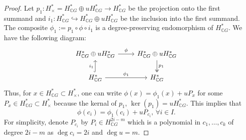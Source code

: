 \documentclass{amsart}
\begin{document}
\begin{proof}
		Let $p_1: H^*_{\times} = H^*_{\mathbb{C}G} \oplus u H^*_{\mathbb{C}G} \to H^*_{\mathbb{C}G}$ be the projection onto the first summand and $i_1: H^*_{\mathbb{C}G} \hookrightarrow H^*_{\mathbb{C}G} \oplus u H^*_{\mathbb{C}G}$ be the inclusion into the first summand. The composite $\phi_1:= p_1 \circ \phi \circ i_1$ is a degree-preserving endomorphism of $H^*_{\mathbb{C}G}$. We have the following %
diagram:
		\begin{equation}\label{comm diagram}
			\begin{tikzcd}
				{H^*_{\mathbb CG}\oplus u H^*_{\mathbb CG}} & {H^*_{\mathbb CG} \oplus u H^*_{\mathbb CG}} \\
				{H^*_{\mathbb CG}} & {H^*_{\mathbb CG}}
				\arrow["\phi", from=1-1, to=1-2]
				\arrow["{p_1}", two heads, from=1-2, to=2-2]
				\arrow["{i_1}", hook, from=2-1, to=1-1]
				\arrow["{\phi_1}", from=2-1, to=2-2]
			\end{tikzcd}
		\end{equation}
		Thus, %
for  $x \in H^*_{\mathbb{C}G} \subset H^*_\times$, one can write
		$\phi(x) = \phi_1(x) + u P_x$
		for some $P_x \in H^*_{\mathbb{C}G} \subset H^*_\times$ because the kernal of $p_1$, $\ker(p_1) = u H^*_{\mathbb{C}G}$.
		This implies that \begin{equation}\label{defn of phi}
			\phi(c_i) = \phi_1(c_i) + u P_{c_i},\, \forall i \in I.
		\end{equation} For simplicity, denote $P_{c_i}$ by $P_i\in H^{2i-m}_{\mathbb CG}$ which is a polynomial in $c_1, \dots, c_k$ of degree $2i - m$ as $\deg c_i = 2i$ and $\deg u = m$.
		
		
		

\end{proof}
\end{document}
